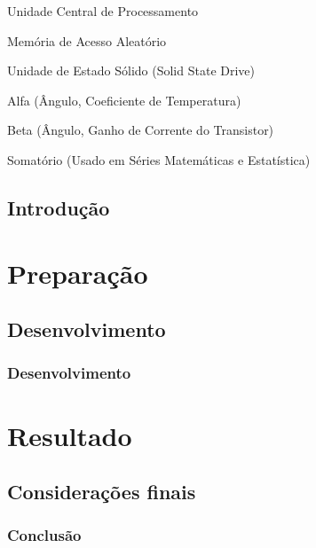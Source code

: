 \documentclass{Arquivos/TrabalhoAcademico}
\begin{document}
\begin{siglas}
    \item[CPU] Unidade Central de Processamento
    \item[RAM] Memória de Acesso Aleatório
    \item[SSD] Unidade de Estado Sólido (Solid State Drive)
\end{siglas}


\begin{simbolos}
    \item[$\alpha$] Alfa (Ângulo, Coeficiente de Temperatura)
    \item[$\beta$] Beta (Ângulo, Ganho de Corrente do Transistor)
    \item[$\sum$] Somatório (Usado em Séries Matemáticas e Estatística)
\end{simbolos}


\Sumario


\textual %


\chapter{Introdução}


\part{Preparação} %
\chapter{Desenvolvimento}
\section{Desenvolvimento}


\part{Resultado} %
\chapter{Considerações finais}
\section{Conclusão}


\postextual %


\printbibliography[heading=none]
\end{document}
